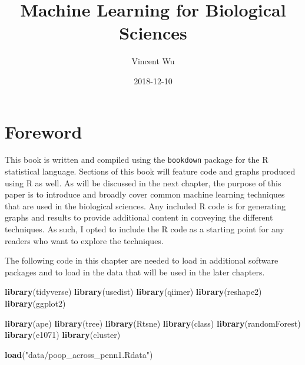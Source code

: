 \documentclass[12pt,openany]{book}
\title{Machine Learning for Biological Sciences}
\author{Vincent Wu}
\date{2018-12-10}
\newenvironment{Shaded}{\begin{snugshade}}{\end{snugshade}}
\newcommand{\KeywordTok}[1]{\textcolor[rgb]{0.13,0.29,0.53}{\textbf{#1}}}
\newcommand{\StringTok}[1]{\textcolor[rgb]{0.31,0.60,0.02}{#1}}
\newcommand{\NormalTok}[1]{#1}
\begin{document}
\maketitle

{
\setcounter{tocdepth}{1}
\tableofcontents
}
\chapter{Foreword}\label{foreword}

This book is written and compiled using the \texttt{bookdown} package
for the R statistical language. Sections of this book will feature code
and graphs produced using R as well. As will be discussed in the next
chapter, the purpose of this paper is to introduce and broadly cover
common machine learning techniques that are used in the biological
sciences. Any included R code is for generating graphs and results to
provide additional content in conveying the different techniques. As
such, I opted to include the R code as a starting point for any readers
who want to explore the techniques.

The following code in this chapter are needed to load in additional
software packages and to load in the data that will be used in the later
chapters.

\begin{Shaded}
\begin{Highlighting}[]
\KeywordTok{library}\NormalTok{(tidyverse)}
\KeywordTok{library}\NormalTok{(usedist)}
\KeywordTok{library}\NormalTok{(qiimer)}
\KeywordTok{library}\NormalTok{(reshape2)}
\KeywordTok{library}\NormalTok{(ggplot2)}

\KeywordTok{library}\NormalTok{(ape)}
\KeywordTok{library}\NormalTok{(tree)}
\KeywordTok{library}\NormalTok{(Rtsne)}
\KeywordTok{library}\NormalTok{(class)}
\KeywordTok{library}\NormalTok{(randomForest)}
\KeywordTok{library}\NormalTok{(e1071)}
\KeywordTok{library}\NormalTok{(cluster)}
\end{Highlighting}
\end{Shaded}

\begin{Shaded}
\begin{Highlighting}[]
\KeywordTok{load}\NormalTok{(}\StringTok{"data/poop_across_penn1.Rdata"}\NormalTok{)}
\end{Highlighting}
\end{Shaded}
\end{document}
